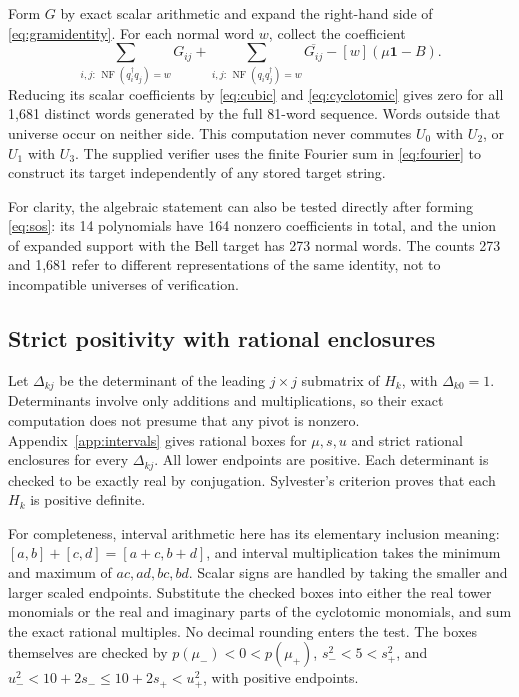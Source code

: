 \documentclass[11pt,a4paper]{article}
\numberwithin{equation}{section}
\theoremstyle{remark}\newtheorem{remark}[theorem]{Remark}
\newcommand{\id}{\mathbf 1}
\newcommand{\NF}{\operatorname{NF}}
\newcommand{\adj}{\dagger}
\begin{document}
Form $G$ by exact scalar arithmetic and expand the right-hand side of
\eqref{eq:gramidentity}. For each normal word $w$, collect the coefficient
\begin{equation}\label{eq:wordtest}
 \sum_{i,j:\,\NF(q_i^\adj q_j)=w}G_{ij}
 +\sum_{i,j:\,\NF(q_iq_j^\adj)=w}\overline{G_{ij}}
 -[w](\mu\id-B).
\end{equation}
Reducing its scalar coefficients by \eqref{eq:cubic} and
\eqref{eq:cyclotomic} gives zero for all 1,681 distinct words generated
by the full 81-word sequence. Words outside that universe occur on neither
side. This computation never commutes $U_0$ with $U_2$, or $U_1$ with $U_3$.
The supplied verifier uses the finite Fourier sum in \eqref{eq:fourier}
to construct its target independently of any stored target string.

For clarity, the algebraic statement can also be tested directly after
forming \eqref{eq:sos}: its 14 polynomials have 164 nonzero coefficients in
total, and the union of expanded support with the Bell target has 273
normal words. The counts 273 and 1,681 refer to different representations
of the same identity, not to incompatible universes of verification.

\subsection{Strict positivity with rational enclosures}\label{sec:positive}
Let $\Delta_{kj}$ be the determinant of the leading $j\times j$ submatrix
of $H_k$, with $\Delta_{k0}=1$. Determinants involve only additions and
multiplications, so their exact computation does not presume that any pivot
is nonzero. Appendix~\ref{app:intervals} gives rational boxes for $\mu,s,u$
and strict rational enclosures for every $\Delta_{kj}$. All lower endpoints
are positive. Each determinant is checked to be exactly real by conjugation.
Sylvester's criterion proves that each $H_k$ is positive definite.

For completeness, interval arithmetic here has its elementary inclusion
meaning: $[a,b]+[c,d]=[a+c,b+d]$, and interval multiplication takes the minimum
and maximum of $ac,ad,bc,bd$. Scalar signs are handled by taking the smaller
and larger scaled endpoints. Substitute the checked boxes into either the
real tower monomials or the real and imaginary parts of the cyclotomic
monomials, and sum the exact rational multiples. No decimal rounding enters
the test. The boxes themselves are checked by $p(\mu_-)<0<p(\mu_+)$,
$s_-^2<5<s_+^2$, and
$u_-^2<10+2s_-\leq10+2s_+<u_+^2$, with positive endpoints.
\end{document}
